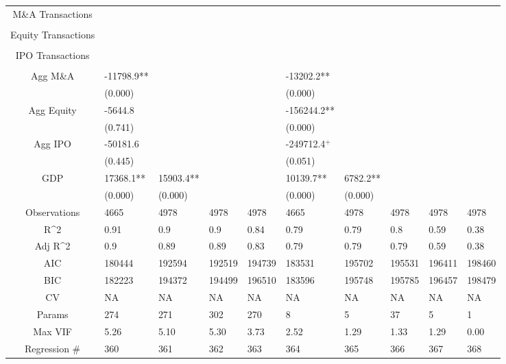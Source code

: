 \documentclass{article}
\begin{document}
\begin{table}[H]
\begin{tabular}{|clllllllll|}
  M\&A Transactions &  &  &  &  &  &  &  &  &  \\ 
   &  &  &  &  &  &  &  &  &  \\ 
  Equity Transactions &  &  &  &  &  &  &  &  &  \\ 
   &  &  &  &  &  &  &  &  &  \\ 
  IPO Transactions &  &  &  &  &  &  &  &  &  \\ 
   &  &  &  &  &  &  &  &  &  \\ 
  Agg M\&A & -11798.9** &  &  &  & -13202.2** &  &  &  &  \\ 
   & (0.000) &  &  &  & (0.000) &  &  &  &  \\ 
  Agg Equity & -5644.8 &  &  &  & -156244.2** &  &  &  &  \\ 
   & (0.741) &  &  &  & (0.000) &  &  &  &  \\ 
  Agg IPO & -50181.6 &  &  &  & -249712.4$^{+}$ &  &  &  &  \\ 
   & (0.445) &  &  &  & (0.051) &  &  &  &  \\ 
  GDP & 17368.1** & 15903.4** &  &  & 10139.7** & 6782.2** &  &  &  \\ 
   & (0.000) & (0.000) &  &  & (0.000) & (0.000) &  &  &  \\ 
  \hline 
 Observations & 4665 & 4978 & 4978 & 4978 & 4665 & 4978 & 4978 & 4978 & 4978 \\ 
  R^2 & 0.91 & 0.9 & 0.9 & 0.84 & 0.79 & 0.79 & 0.8 & 0.59 & 0.38 \\ 
  Adj R^2 & 0.9 & 0.89 & 0.89 & 0.83 & 0.79 & 0.79 & 0.79 & 0.59 & 0.38 \\ 
  AIC & 180444 & 192594 & 192519 & 194739 & 183531 & 195702 & 195531 & 196411 & 198460 \\ 
  BIC & 182223 & 194372 & 194499 & 196510 & 183596 & 195748 & 195785 & 196457 & 198479 \\ 
  CV & NA & NA & NA & NA & NA & NA & NA & NA & NA \\ 
  Params & 274 & 271 & 302 & 270 & 8 & 5 & 37 & 5 & 1 \\ 
  Max VIF & 5.26 & 5.10 & 5.30 & 3.73 & 2.52 & 1.29 & 1.33 & 1.29 & 0.00 \\ 
  Regression \# & 360 & 361 & 362 & 363 & 364 & 365 & 366 & 367 & 368 \\ 
   \hline
\end{tabular}
 
\end{table}
\end{document}
